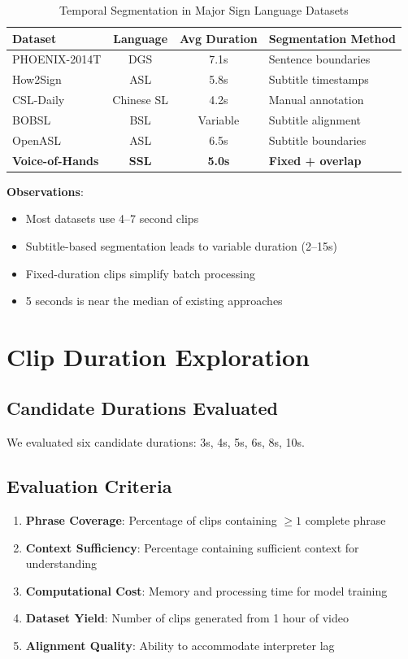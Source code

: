 \documentclass[11pt,a4paper]{article}
\begin{document}
\begin{table}[htbp]
\centering
\caption{Temporal Segmentation in Major Sign Language Datasets}
\begin{tabular}{@{}lccl@{}}
\toprule
\textbf{Dataset} & \textbf{Language} & \textbf{Avg Duration} & \textbf{Segmentation Method} \\ \midrule
PHOENIX-2014T & DGS & 7.1s & Sentence boundaries \\
How2Sign & ASL & 5.8s & Subtitle timestamps \\
CSL-Daily & Chinese SL & 4.2s & Manual annotation \\
BOBSL & BSL & Variable & Subtitle alignment \\
OpenASL & ASL & 6.5s & Subtitle boundaries \\
\textbf{Voice-of-Hands} & \textbf{SSL} & \textbf{5.0s} & \textbf{Fixed + overlap} \\
\bottomrule
\end{tabular}
\end{table}

\textbf{Observations}:
\begin{itemize}
    \item Most datasets use 4--7 second clips
    \item Subtitle-based segmentation leads to variable duration (2--15s)
    \item Fixed-duration clips simplify batch processing
    \item 5 seconds is near the median of existing approaches
\end{itemize}

\section{Clip Duration Exploration}

\subsection{Candidate Durations Evaluated}

We evaluated six candidate durations: 3s, 4s, 5s, 6s, 8s, 10s.

\subsection{Evaluation Criteria}

\begin{enumerate}
    \item \textbf{Phrase Coverage}: Percentage of clips containing $\geq 1$ complete phrase
    \item \textbf{Context Sufficiency}: Percentage containing sufficient context for understanding
    \item \textbf{Computational Cost}: Memory and processing time for model training
    \item \textbf{Dataset Yield}: Number of clips generated from 1 hour of video
    \item \textbf{Alignment Quality}: Ability to accommodate interpreter lag
\end{enumerate}
\end{document}
